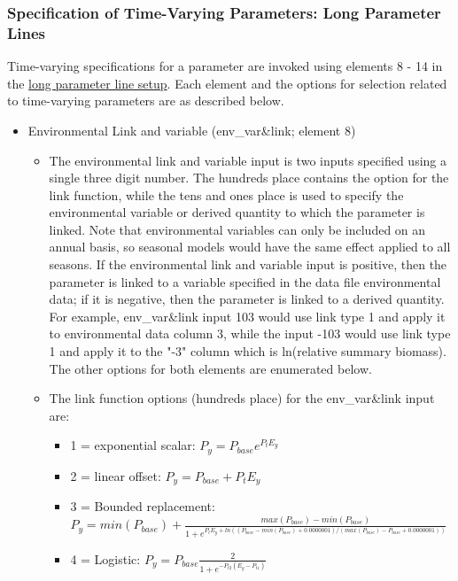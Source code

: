\subsubsection{Specification of Time-Varying Parameters: Long Parameter Lines} 

Time-varying specifications for a parameter are invoked using elements 8 - 14 in the \hyperlink{paraOrder}{long parameter line setup}. Each element and the options for selection related to time-varying parameters are as described below.

\hypertarget{EnvVar}{}
\begin{itemize}

\item Environmental Link and variable (env\_var\&link; element 8)

	\begin{itemize}
	   \item The environmental link and variable input is two inputs specified using a single three digit number. The hundreds place contains the option for the link function, while the tens and ones place is used to specify the environmental variable or derived quantity to which the parameter is linked. Note that environmental variables can only be included on an annual basis, so seasonal models would have the same effect applied to all seasons. If the environmental link and variable input is positive, then the parameter is linked to a variable specified in the data file environmental data; if it is negative, then the parameter is linked to a derived quantity. For example, env\_var\&link input 103 would use link type 1 and apply it to environmental data column 3, while the input -103  would use link type 1 and apply it to the "-3" column which is ln(relative summary biomass). The other options for both elements are enumerated below.
	   \item The link function options (hundreds place) for the env\_var\&link input are:
	   \begin{itemize}
	       \item 1 = exponential scalar: $P_{y} = P_{base}e^{P_{t}E_{y}}$
		   \item 2 = linear offset: $P_{y} = P_{base} + P_{t}E_{y}$
		   \item 3 = Bounded replacement: $P_{y} = min(P_{base})+\frac{max(P_{base})-min(P_{base})}{1+e^{P_tE_y+ln((P_{base}-min(P_{base})+0.0000001)/(max(P_{base})-P_{base}+0.0000001))}}$
		   \item 4 = Logistic: $P_{y} = P_{base}\frac{2}{1+e^{-P_{t2}(E_{y}-P_{t1})}}$

\end{itemize}
\end{itemize}
\end{itemize}

